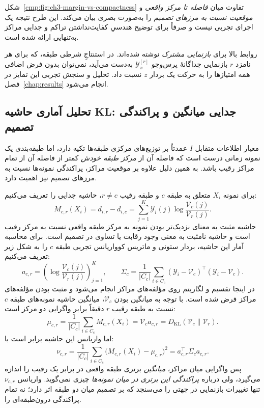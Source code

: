 شکل~\ref{cmp:fig:ch3-margin-vs-compactness}
تفاوت میان \emph{فاصله تا مرکز واقعی} و
\emph{موقعیت نسبت به مرزهای تصمیم} را
به‌صورت بصری بیان می‌کند. این طرح
نتیجه یک اجرای تجربی نیست و صرفاً
برای توضیح هندسیِ کفایت‌نداشتن
تراکم و جدایی مراکز به‌تنهایی
ارائه شده است.

 روابط بالا برای \emph{بازنمایی مشترک}
نوشته شده‌اند. در استنتاجِ شرطی طبقه، که برای هر نامزد
$r$ بازنمایی جداگانهٔ پرس‌وجو $\mathscr Y_x^{[r]}$ به‌دست می‌آید،
نمی‌توان بدون فرض اضافی همه امتیازها را به حرکت یک
بردار $z$ نسبت داد. تحلیل و سنجش تجربی این تمایز در
فصل~\ref{chap:results} انجام می‌شود.





\subsection{تحلیل آماری حاشیه KL: جدایی میانگین و پراکندگی تصمیم}
\label{cmp:subsec:ch3-margin-statistics}
معیار اطلاعات متقابل $I$ عمدتاً بر توزیع‌های مرکزی طبقه‌ها تکیه دارد، اما طبقه‌بندی یک نمونه زمانی درست است که فاصله آن از \emph{مرکز طبقه خودش} کمتر از فاصله آن از تمام مراکز رقیب باشد. به همین دلیل علاوه بر موقعیت مراکز، پراکندگی نمونه‌ها نسبت به مرزهای تصمیم نیز اهمیت دارد.

برای نمونه $X_i$ متعلق به طبقه $c$ و طبقه رقیب $r\ne c$، حاشیه جدایی را تعریف می‌کنیم:
\begin{equation}\label{cmp:eq:ch3-margin-definition}
\boxed{M_{c,r}(X_i)=d_{i,r}-d_{i,c}
=\sum_{j=1}^{K}\mathscr Y_i(j)
\log\frac{\mathcal V_c(j)}{\mathcal V_r(j)}.}
\end{equation}
حاشیه مثبت به معنای نزدیک‌تر بودن نمونه به مرکز طبقه واقعی نسبت به مرکز رقیب است و حاشیه نامثبت به معنی وجود رقابت یا تساوی در تصمیم است. برای محاسبه آمار این حاشیه، بردار ستونی و ماتریس کوواریانس تجربی طبقه $c$ را به شکل زیر تعریف می‌کنیم:
\begin{equation}\label{cmp:eq:ch3-margin-coeff-cov}
a_{c,r}=\left(\log\frac{\mathcal V_c(j)}{\mathcal V_r(j)}\right)_{j=1}^{K},
\qquad
\Sigma_c=\frac1{|C_c|}\sum_{i\in C_c}
(\mathscr Y_i-\mathcal V_c)^\top
(\mathscr Y_i-\mathcal V_c).
\end{equation}
در اینجا تقسیم و لگاریتم روی مؤلفه‌های مراکز انجام می‌شود و مثبت بودن مؤلفه‌های مراکز فرض شده است. با توجه به میانگین بودن $\mathcal V_c$، میانگین حاشیه نمونه‌های طبقه $c$ نسبت به طبقه رقیب $r$ دقیقاً برابر واگرایی دو مرکز است:
\begin{equation}\label{cmp:eq:ch3-margin-mean}
\boxed{
\mu_{c,r}=\frac1{|C_c|}\sum_{i\in C_c}M_{c,r}(X_i)
=\mathcal V_c a_{c,r}
=D_{\mathrm{KL}}(\mathcal V_c\|\mathcal V_r).}
\end{equation}
اما واریانس این حاشیه برابر است با:
\begin{equation}\label{cmp:eq:ch3-margin-variance}
\boxed{
\nu_{c,r}=\frac1{|C_c|}\sum_{i\in C_c}
\bigl(M_{c,r}(X_i)-\mu_{c,r}\bigr)^2
=a_{c,r}^{\top}\Sigma_c a_{c,r}.}
\end{equation}
پس واگرایی میان مراکز، \emph{میانگین} برتری طبقه واقعی در برابر یک رقیب را اندازه می‌گیرد، ولی درباره \emph{پراکندگی این برتری در میان نمونه‌ها} چیزی نمی‌گوید. واریانس $\nu_{c,r}$ تنها تغییرات بازنمایی در جهتی را می‌سنجد که بر تصمیم میان دو طبقه اثر دارد؛ نه تمام پراکندگی درون‌طبقه‌ای را.

